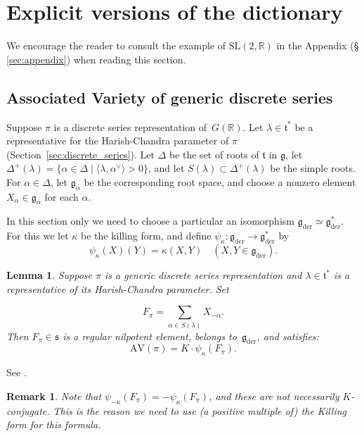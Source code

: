 \documentclass[cupthm]{CUP-JNL-JMJ}
\numberwithin{equation}{section}
\theoremstyle{cupplain}
\newtheorem{lemma}[theorem]{Lemma}
\theoremstyle{cupdefinition}
\theoremstyle{cupremark}
\newtheorem{remark}[theorem]{Remark}
\theoremstyle{cupproof}
\newcommand{\R}{\mathbb R}
\newcommand{\ch}[1]{#1^\vee}
\renewcommand{\t}{\mathfrak t}
\newcommand{\g}{\mathfrak g}
\newcommand{\gder}{\mathfrak g_{\mathrm{der}}}
\newcommand{\s}{\mathfrak s}
\newcommand{\AV}{\mathrm{AV}}
\begin{document}
\section{Explicit versions of the dictionary}\label{sec:explicit}

We encourage the reader to consult the example of $\mathrm{SL}(2,\R)$ in the Appendix (\S\,\ref{sec:appendix}) when reading this section.

\subsection{Associated Variety of generic discrete series}
\label{s:AV}

Suppose $\pi$ is a  discrete series representation of~$G(\R)$. Let
$\lambda\in\t^*$ be a representative for the Harish-Chandra parameter of $\pi$ (Section~\ref{sec:discrete_series}). Let $\Delta$ be the set of roots of $\t$ in $\g$, 
let $\Delta^+(\lambda)=\{\alpha \in \Delta \mid \langle\lambda,\ch\alpha\rangle>0\}$,
and let $S(\lambda)\subset\Delta^+(\lambda)$ be the simple roots.
For $\alpha\in \Delta$, let $\g_\alpha$ be the corresponding root space, and choose a nonzero element $X_\alpha\in\g_\alpha$ for each $\alpha$.

In this section only we need to  choose a particular an isomorphism \mbox{$\gder\simeq \gder^*$}.
For this we let $\kappa$ be the killing form, and define $\psi_\kappa:\gder\rightarrow \gder^*$ by
$$
\psi_\kappa(X)(Y)=\kappa(X,Y)\quad (X,Y\in \gder).
$$

\begin{lemma}
\label{l:pi_to_av}
  \label{l:AV}
Suppose $\pi$ is a generic discrete series representation and $\lambda\in\t^*$ is a representative of its  Harish-Chandra parameter.
Set

\begin{equation}
  \label{e:Fpi}
  F_\pi=\sum_{\alpha\in S(\lambda)}X_{-\alpha}.
\end{equation}
Then $F_\pi\in\s$ is a regular nilpotent element, belongs to~$\gder$, and satisfies: 
$$
\AV(\pi)=K\cdot \psi_\kappa(F_\pi).
$$
\end{lemma}
See
\cite[Propositions A.7 and A.9]{AV1}.

\begin{remark}
Note that $\psi_{-\kappa}(F_\pi)=-\psi_{\kappa}(F_\pi)$, and these are not necessarily $K$-conjugate.
  This is the reason we need to use (a positive multiple of) the Killing form for this formula.
\end{remark}
\end{document}
